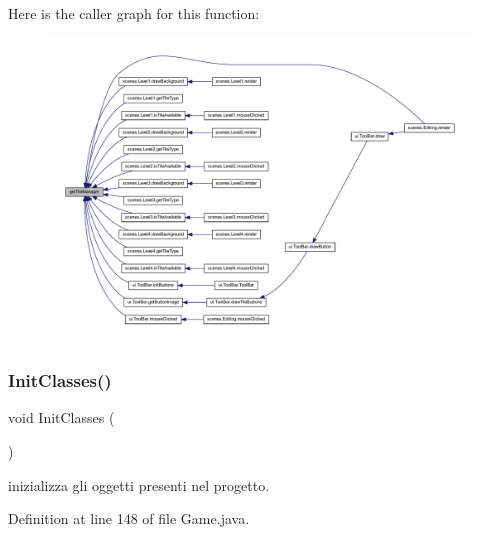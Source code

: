 Here is the caller graph for this function\+:\nopagebreak
\begin{figure}[H]
\begin{center}
\leavevmode
\includegraphics[width=350pt]{classprogetto_1_1_game_ad519f2a339c804d206a38ecd2c33f667_icgraph}
\end{center}
\end{figure}
\mbox{\label{classprogetto_1_1_game_a3e57c234c3dde4539f8b9c47d75e59ae}} 
\subsubsection{\texorpdfstring{Init\+Classes()}{InitClasses()}}
{\footnotesize\ttfamily void Init\+Classes (\begin{DoxyParamCaption}{ }\end{DoxyParamCaption})\hspace{0.3cm}{\ttfamily [private]}}



inizializza gli oggetti presenti nel progetto. 



Definition at line 148 of file Game.\+java.

